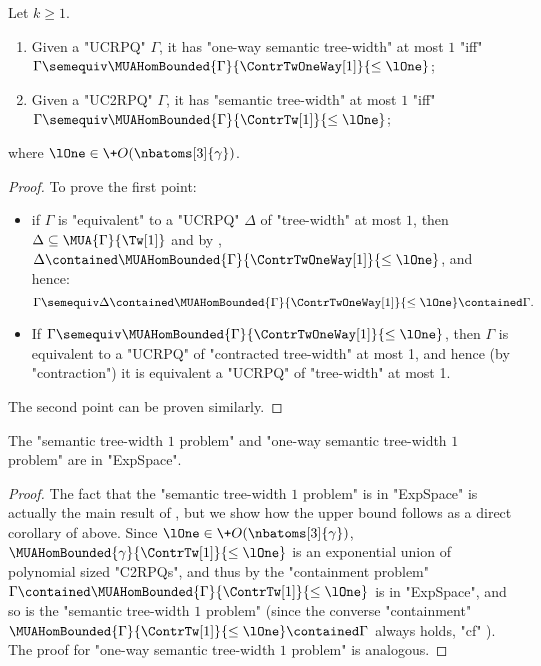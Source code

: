 \begin{lemma}
	\AP\label{lemma:characterisation-bounded-semantic-tw}
	Let $k \geq 1$.
	\begin{enumerate}
		\item Given a "UCRPQ" $\Gamma$, it has "one-way semantic tree-width" at most $1$
			"iff" $\Gamma \semequiv \MUAHomBounded{\Gamma}{\ContrTwOneWay[1]}{\leq\lOne}$;
		\item Given a "UC2RPQ" $\Gamma$, it has "semantic tree-width" at most $1$
			"iff" $\Gamma \semequiv \MUAHomBounded{\Gamma}{\ContrTw[1]}{\leq\lOne}$;
	\end{enumerate}
	where $\lOne \in \+O(\nbatoms[3]{\gamma})$.
\end{lemma}
\begin{proof}
	To prove the first point:
	\begin{itemize}
		\item if $\Gamma$ is "equivalent" to a "UCRPQ" $\Delta$ of "tree-width" at most $1$, then
			$\Delta \subseteq \MUA{\Gamma}{\Tw[1]}$ and by ,
			$\Delta \contained \MUAHomBounded{\Gamma}{\ContrTwOneWay[1]}{\leq\lOne}$,
			and hence:
			\[
				\Gamma \semequiv \Delta
				\contained \MUAHomBounded{\Gamma}{\ContrTwOneWay[1]}{\leq\lOne}
				\contained \Gamma.
			\]
		\item If $\Gamma \semequiv \MUAHomBounded{\Gamma}{\ContrTwOneWay[1]}{\leq\lOne}$, 
			then $\Gamma$ is equivalent to a "UCRPQ" of "contracted tree-width" at
			most 1, and hence (by "contraction") it is equivalent a "UCRPQ" of "tree-width" at most 1. 
	\end{itemize}
	The second point can be proven similarly.
\end{proof}
\begin{corollary}[Upper bound of \Cref{thm:decidability-semtw} for $k=1$]
	\AP\label{cor:sem-tw-1-pb-exp-c}
	The "semantic tree-width $1$ problem" and "one-way semantic tree-width $1$ problem" are in "ExpSpace".
\end{corollary}
\begin{proof}
	The fact that the "semantic tree-width $1$ problem" is in "ExpSpace" is actually the main result of \cite[Theorem~6.1]{BarceloRV16}, but we show how the upper bound follows as a direct corollary of  above.
	Since $\lOne \in \+O(\nbatoms[3]{\gamma})$,
	$\MUAHomBounded{\gamma}{\ContrTw[1]}{\leq\lOne}$ is an exponential union of polynomial sized "C2RPQs", and thus by  the "containment problem" $\Gamma \contained \MUAHomBounded{\Gamma}{\ContrTw[1]}{\leq\lOne}$ is in "ExpSpace", and so is the "semantic tree-width $1$ problem" (since the converse "containment" $\MUAHomBounded{\Gamma}{\ContrTw[1]}{\leq\lOne} \contained \Gamma$ always holds, "cf" ).
	The proof for "one-way semantic tree-width $1$ problem" is analogous.
\end{proof}

